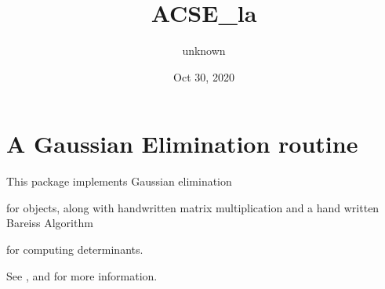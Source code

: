 \documentclass[letterpaper,10pt,english]{sphinxmanual}
\title{ACSE\_la}
\date{Oct 30, 2020}
\author{unknown}
\begin{document}
\pagestyle{empty}
\sphinxmaketitle
\pagestyle{plain}
\sphinxtableofcontents
\pagestyle{normal}
\label{\detokenize{index::doc}}



\chapter{A Gaussian Elimination routine}
\label{\detokenize{index:a-gaussian-elimination-routine}}
This package implements Gaussian elimination %
\begin{footnote}[1]\sphinxAtStartFootnote
{}
%
\end{footnote} for  objects, along with hand\sphinxhyphen{}written matrix multiplication and a hand written Bareiss Algorithm %
\begin{footnote}[2]\sphinxAtStartFootnote
{}
%
\end{footnote} for computing determinants.

See {\hyperref[\detokenize{index:acse_la.gauss}]{}},  and  for more information.

\label{\detokenize{index:module-acse_la}}
\end{document}
